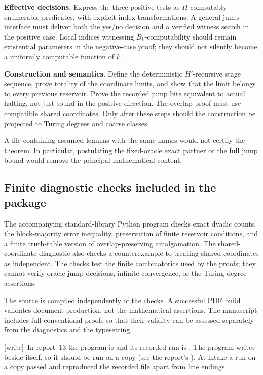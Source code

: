 \documentclass[11pt,letterpaper]{article}
\theoremstyle{definition}
\theoremstyle{remark}\newtheorem{remark}[theorem]{Remark}
\numberwithin{equation}{section}
\newcommand{\wtag}{\textup{[write]}}
\begin{document}
\textbf{Effective decisions.} Express the three positive tests as $H$-computably enumerable predicates, with explicit index transformations. A general jump interface must deliver both the yes/no decision and a verified witness search in the positive case. Local indices witnessing $B_k$-computability should remain existential parameters in the negative-case proof; they should not silently become a uniformly computable function of $k$.

\textbf{Construction and semantics.} Define the deterministic $H'$-recursive stage sequence, prove totality of the coordinate limits, and show that the limit belongs to every previous reservoir. Prove the recorded jump bits equivalent to actual halting, not just sound in the positive direction. The overlap proof must use compatible shared coordinates. Only after these steps should the construction be projected to Turing degrees and coarse classes.

A file containing assumed lemmas with the same names would not certify the theorem. In particular, postulating the fixed-oracle exact partner or the full jump bound would remove the principal mathematical content.

\subsection{Finite diagnostic checks included in the package}\label{cr13:sec:diagnostics}
The accompanying standard-library Python program checks exact dyadic counts, the block-majority error inequality, preservation of finite reservoir conditions, and a finite truth-table version of overlap-preserving amalgamation. The shared-coordinate diagnostic also checks a counterexample to treating shared coordinates as independent. The checks test the finite combinatorics used by the proofs; they cannot verify oracle-jump decisions, infinite convergence, or the Turing-degree assertions.

The source is compiled independently of the checks. A successful PDF build validates document production, not the mathematical assertions. The manuscript includes full conventional proofs so that their validity can be assessed separately from the diagnostics and the typesetting.

\noindent\wtag\ In report~13 the program is  and its recorded run is . The program writes  beside itself, so it should be run on a copy (see the report's ). At intake a run on a copy passed and reproduced the recorded file apart from line endings.
\end{document}
